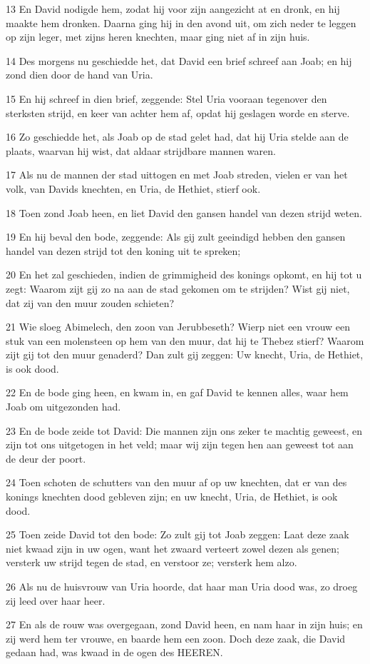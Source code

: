 \par 13 En David nodigde hem, zodat hij voor zijn aangezicht at en dronk, en hij maakte hem dronken. Daarna ging hij in den avond uit, om zich neder te leggen op zijn leger, met zijns heren knechten, maar ging niet af in zijn huis.
\par 14 Des morgens nu geschiedde het, dat David een brief schreef aan Joab; en hij zond dien door de hand van Uria.
\par 15 En hij schreef in dien brief, zeggende: Stel Uria vooraan tegenover den sterksten strijd, en keer van achter hem af, opdat hij geslagen worde en sterve.
\par 16 Zo geschiedde het, als Joab op de stad gelet had, dat hij Uria stelde aan de plaats, waarvan hij wist, dat aldaar strijdbare mannen waren.
\par 17 Als nu de mannen der stad uittogen en met Joab streden, vielen er van het volk, van Davids knechten, en Uria, de Hethiet, stierf ook.
\par 18 Toen zond Joab heen, en liet David den gansen handel van dezen strijd weten.
\par 19 En hij beval den bode, zeggende: Als gij zult geeindigd hebben den gansen handel van dezen strijd tot den koning uit te spreken;
\par 20 En het zal geschieden, indien de grimmigheid des konings opkomt, en hij tot u zegt: Waarom zijt gij zo na aan de stad gekomen om te strijden? Wist gij niet, dat zij van den muur zouden schieten?
\par 21 Wie sloeg Abimelech, den zoon van Jerubbeseth? Wierp niet een vrouw een stuk van een molensteen op hem van den muur, dat hij te Thebez stierf? Waarom zijt gij tot den muur genaderd? Dan zult gij zeggen: Uw knecht, Uria, de Hethiet, is ook dood.
\par 22 En de bode ging heen, en kwam in, en gaf David te kennen alles, waar hem Joab om uitgezonden had.
\par 23 En de bode zeide tot David: Die mannen zijn ons zeker te machtig geweest, en zijn tot ons uitgetogen in het veld; maar wij zijn tegen hen aan geweest tot aan de deur der poort.
\par 24 Toen schoten de schutters van den muur af op uw knechten, dat er van des konings knechten dood gebleven zijn; en uw knecht, Uria, de Hethiet, is ook dood.
\par 25 Toen zeide David tot den bode: Zo zult gij tot Joab zeggen: Laat deze zaak niet kwaad zijn in uw ogen, want het zwaard verteert zowel dezen als genen; versterk uw strijd tegen de stad, en verstoor ze; versterk hem alzo.
\par 26 Als nu de huisvrouw van Uria hoorde, dat haar man Uria dood was, zo droeg zij leed over haar heer.
\par 27 En als de rouw was overgegaan, zond David heen, en nam haar in zijn huis; en zij werd hem ter vrouwe, en baarde hem een zoon. Doch deze zaak, die David gedaan had, was kwaad in de ogen des HEEREN.

